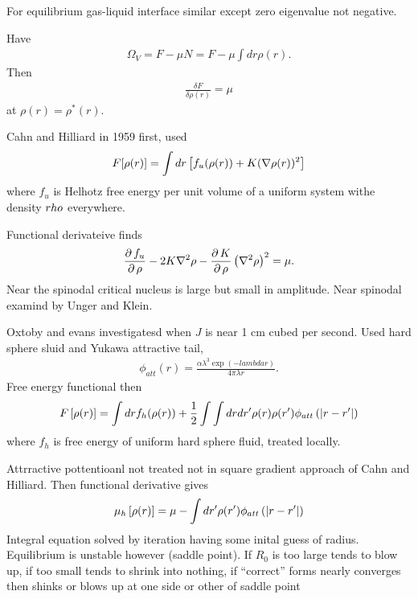For equilibrium gas-liquid interface similar except zero eigenvalue not negative. 

Have
\begin{align}
\Omega_V = F - \mu N = F - \mu \int dr \rho(r).
\end{align}
Then \begin{align}
\frac{\delta F}{\delta \rho(r)} = \mu
\end{align}
at $\rho(r) = \rho^\ast(r)$.

Cahn and Hilliard in 1959 first,
used
\begin{align}
F[\rho(r)] = \int dr \left[ f_u (\rho(r)) + K(\nabla \rho(r))^2 \right]
\end{align}
where $f_u$ is Helhotz free energy per unit volume of a uniform system withe density $\\rho$ everywhere.

Functional derivateive finds
\begin{align}
\frac{\operatorname{\partial} f_u}{\operatorname{\partial} \rho} - 2K \nabla^2 \rho - \frac{\operatorname{\partial} K}{\operatorname{\partial} \rho}\left( \nabla^2 \rho \right)^2 = \mu.
\end{align}
Near the spinodal critical nucleus is large but small in amplitude.
Near spinodal examind by Unger and Klein. 

Oxtoby and evans investigatesd when $J$ is near 1 cm cubed per second. 
Used hard sphere sluid and Yukawa attractive tail,
\begin{align}
\phi_{att}(r) = \frac{\alpha \lambda^3 \exp(-lambda r)}{4\pi \lambda r}.
\end{align}
Free energy functional then
\begin{align}
F\left[ \rho(r) \right] = \int d r f_h(\rho(r)) + \frac{1}{2}\int \int dr dr^\prime \rho(r) \rho(r^\prime) \phi_{att}\left( \left| r-r^\prime \right| \right)
\end{align}
where $f_h$ is free energy of uniform hard sphere fluid, treated locally.

Attrractive pottentioanl not treated not in square gradient approach of Cahn and Hilliard.
Then functional derivative gives
\begin{align}
\mu_h\left[ \rho(r) \right] = \mu - \int d r^\prime \rho(r^\prime) \phi_{att} \left( \left| r-r^\prime \right| \right)
\end{align}
Integral equation solved by iteration having some inital guess of radius.
Equilibrium is unstable however (saddle point).
If $R_0$ is too large tends to blow up, if too small tends to shrink into nothing,
if ``correct'' forms nearly converges then shinks or blows up at one side or other of saddle point

